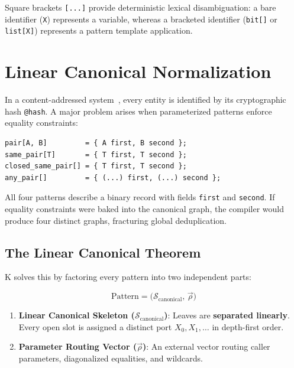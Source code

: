 \documentclass[11pt,a4paper]{article}
\begin{document}
Square brackets \lstinline|[...]| provide deterministic lexical disambiguation: a bare identifier (\lstinline|X|) represents a variable, whereas a bracketed identifier (\lstinline|bit[]| or \lstinline|list[X]|) represents a pattern template application.

\section{Linear Canonical Normalization}

In a content-addressed system~\cite{merkle1987sig}, every entity is identified by its cryptographic hash \lstinline|@hash|. A major problem arises when parameterized patterns enforce equality constraints:

\begin{lstlisting}[language=k]
pair[A, B]         = { A first, B second };
same_pair[T]       = { T first, T second };
closed_same_pair[] = { T first, T second };
any_pair[]         = { (...) first, (...) second };
\end{lstlisting}

All four patterns describe a binary record with fields \lstinline|first| and \lstinline|second|. If equality constraints were baked into the canonical graph, the compiler would produce four distinct graphs, fracturing global deduplication.

\subsection{The Linear Canonical Theorem}

K solves this by factoring every pattern into two independent parts:

\begin{equation}
\text{Pattern} = \bigl(\mathcal{S}_{\text{canonical}},\, \vec{\rho}\bigr)
\end{equation}

\begin{enumerate}
  \item \textbf{Linear Canonical Skeleton ($\mathcal{S}_{\text{canonical}}$)}: Leaves are \textbf{separated linearly}. Every open slot is assigned a distinct port $X_0, X_1, \dots$ in depth-first order.
  \item \textbf{Parameter Routing Vector ($\vec{\rho}$)}: An external vector routing caller parameters, diagonalized equalities, and wildcards.
\end{enumerate}
\end{document}
